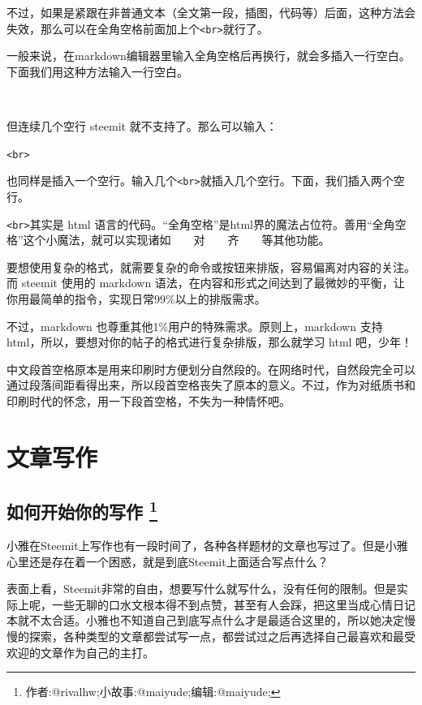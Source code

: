 \documentclass[]{ctexbook}
\begin{document}
不过，如果是紧跟在非普通文本（全文第一段，插图，代码等）后面，这种方法会失效，那么可以在全角空格前面加上个\texttt{\textless{}br\textgreater{}}就行了。

一般来说，在markdown编辑器里输入全角空格后再换行，就会多插入一行空白。下面我们用这种方法输入一行空白。

　　
　　

但连续几个空行 steemit 就不支持了。那么可以输入：

\texttt{\textless{}br\textgreater{}}

也同样是插入一个空行。输入几个\texttt{\textless{}br\textgreater{}}就插入几个空行。下面，我们插入两个空行。

\texttt{\textless{}br\textgreater{}}其实是 html 语言的代码。``全角空格''是html界的魔法占位符。善用``全角空格''这个小魔法，就可以实现诸如　　对　　齐　　等其他功能。

要想使用复杂的格式，就需要复杂的命令或按钮来排版，容易偏离对内容的关注。而 steemit 使用的 markdown 语法，在内容和形式之间达到了最微妙的平衡，让你用最简单的指令，实现日常99\%以上的排版需求。

不过，markdown 也尊重其他1\%用户的特殊需求。原则上，markdown 支持 html，所以，要想对你的帖子的格式进行复杂排版，那么就学习 html 吧，少年！

中文段首空格原本是用来印刷时方便划分自然段的。在网络时代，自然段完全可以通过段落间距看得出来，所以段首空格丧失了原本的意义。不过，作为对纸质书和印刷时代的怀念，用一下段首空格，不失为一种情怀吧。

\hypertarget{wzxzp}{%
\chapter{文章写作}\label{wzxzp}}

\section[如何开始你的写作 ]{\texorpdfstring{如何开始你的写作 \footnote{作者:@rivalhw;小故事:@maiyude;编辑:@maiyude;}}{如何开始你的写作 }}

小雅在Steemit上写作也有一段时间了，各种各样题材的文章也写过了。但是小雅心里还是存在着一个困惑，就是到底Steemit上面适合写点什么？

表面上看，Steemit非常的自由，想要写什么就写什么，没有任何的限制。但是实际上呢，一些无聊的口水文根本得不到点赞，甚至有人会踩，把这里当成心情日记本就不太合适。小雅也不知道自己到底写点什么才是最适合这里的，所以她决定慢慢的探索，各种类型的文章都尝试写一点，都尝试过之后再选择自己最喜欢和最受欢迎的文章作为自己的主打。
\end{document}
